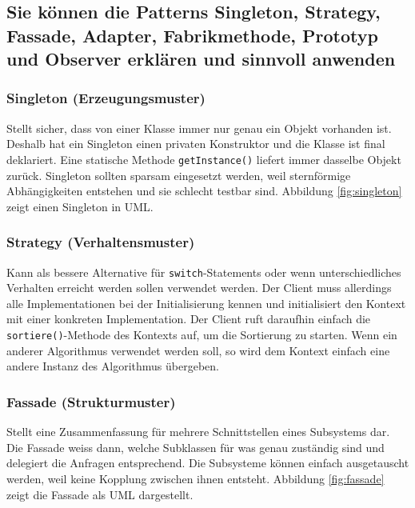 \newpage

\subsection{Sie können die Patterns Singleton, Strategy, Fassade, Adapter, Fabrikmethode, Prototyp und Observer erklären und sinnvoll anwenden}
\label{sec:patterns}

\subsubsection{Singleton (Erzeugungsmuster)}
Stellt sicher, dass von einer Klasse immer nur genau ein Objekt vorhanden ist. Deshalb hat ein Singleton einen privaten Konstruktor und die Klasse ist final deklariert. Eine statische Methode \texttt{getInstance()} liefert immer dasselbe Objekt zurück. Singleton sollten sparsam eingesetzt werden, weil sternförmige Abhängigkeiten entstehen und sie schlecht testbar sind. Abbildung \ref{fig:singleton} zeigt einen Singleton in UML.
    

\subsubsection{Strategy (Verhaltensmuster)}
\label{sec:strategypattern}
Kann als bessere Alternative für \texttt{switch}-Statements oder wenn unterschiedliches Verhalten erreicht werden sollen verwendet werden. Der Client muss allerdings alle Implementationen bei der Initialisierung kennen und initialisiert den Kontext mit einer konkreten Implementation. Der Client ruft daraufhin einfach die \texttt{sortiere()}-Methode des Kontexts auf, um die Sortierung zu starten. Wenn ein anderer Algorithmus verwendet werden soll, so wird dem Kontext einfach eine andere Instanz des Algorithmus übergeben.


\newpage

\subsubsection{Fassade (Strukturmuster)}
Stellt eine Zusammenfassung für mehrere Schnittstellen eines Subsystems dar. Die Fassade weiss dann, welche Subklassen für was genau zuständig sind und delegiert die Anfragen entsprechend. Die Subsysteme können einfach ausgetauscht werden, weil keine Kopplung zwischen ihnen entsteht. Abbildung \ref{fig:fassade} zeigt die Fassade als UML dargestellt.

